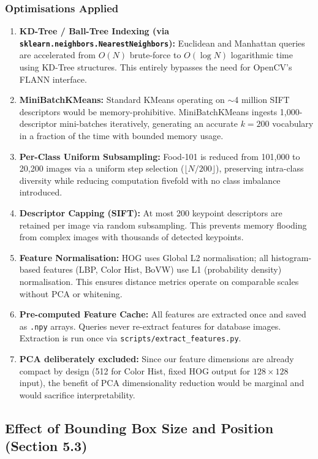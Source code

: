 \documentclass[11pt, a4paper]{article}
\begin{document}
\subsubsection{Optimisations Applied}
\begin{enumerate}
  \item \textbf{KD-Tree / Ball-Tree Indexing (via \texttt{sklearn.neighbors.NearestNeighbors}):} Euclidean and Manhattan queries are accelerated from $O(N)$ brute-force to $O(\log N)$ logarithmic time using KD-Tree structures. This entirely bypasses the need for OpenCV's FLANN interface.
  \item \textbf{MiniBatchKMeans:} Standard KMeans operating on $\sim$4 million SIFT descriptors would be memory-prohibitive. MiniBatchKMeans ingests 1,000-descriptor mini-batches iteratively, generating an accurate $k=200$ vocabulary in a fraction of the time with bounded memory usage.
  \item \textbf{Per-Class Uniform Subsampling:} Food-101 is reduced from 101,000 to 20,200 images via a uniform step selection ($\lfloor N / 200 \rfloor$), preserving intra-class diversity while reducing computation fivefold with no class imbalance introduced.
  \item \textbf{Descriptor Capping (SIFT):} At most 200 keypoint descriptors are retained per image via random subsampling. This prevents memory flooding from complex images with thousands of detected keypoints.
  \item \textbf{Feature Normalisation:} HOG uses Global L2 normalisation; all histogram-based features (LBP, Color Hist, BoVW) use L1 (probability density) normalisation. This ensures distance metrics operate on comparable scales without PCA or whitening.
  \item \textbf{Pre-computed Feature Cache:} All features are extracted once and saved as \texttt{.npy} arrays. Queries never re-extract features for database images. Extraction is run once via \texttt{scripts/extract\_features.py}.
  \item \textbf{PCA deliberately excluded:} Since our feature dimensions are already compact by design (512 for Color Hist, fixed HOG output for $128\times128$ input), the benefit of PCA dimensionality reduction would be marginal and would sacrifice interpretability.
\end{enumerate}

\subsection{Effect of Bounding Box Size and Position (Section 5.3)}
\end{document}

